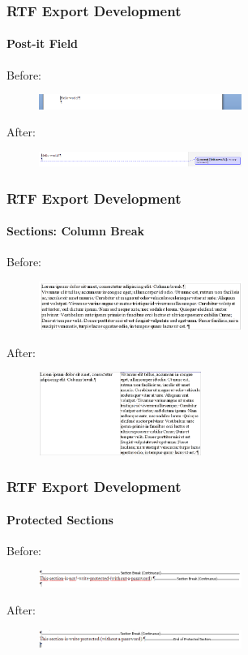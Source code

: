 \documentclass[hyperref={pdfpagelabels=false}]{beamer}
\begin{document}
\begin{frame}
\frametitle{RTF Export Development}
\framesubtitle{Post-it Field}
Before:
\begin{figure}[H]
\includegraphics[width=250px,keepaspectratio]{pic/postit-old.png}
\end{figure}
After:
\begin{figure}[H]
\includegraphics[width=250px,keepaspectratio]{pic/postit-new.png}
\end{figure}
\end{frame}

\begin{frame}
\frametitle{RTF Export Development}
\framesubtitle{Sections: Column Break}
Before:
\begin{figure}[H]
\includegraphics[width=250px,keepaspectratio]{pic/section-column-break-old.png}
\end{figure}
After:
\begin{figure}[H]
\includegraphics[width=200px,keepaspectratio]{pic/section-column-break-new.png}
\end{figure}
\end{frame}

\begin{frame}
\frametitle{RTF Export Development}
\framesubtitle{Protected Sections}
Before:
\begin{figure}[H]
\includegraphics[width=250px,keepaspectratio]{pic/sections-readonly-old.png}
\end{figure}
After:
\begin{figure}[H]
\includegraphics[width=250px,keepaspectratio]{pic/sections-readonly-new.png}
\end{figure}
\end{frame}
\end{document}
